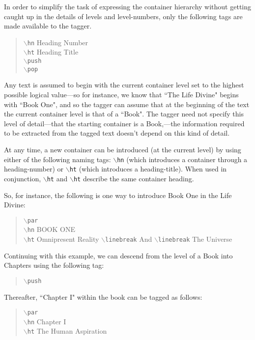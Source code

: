 \documentclass[11pt]{article}
\newcommand{\cmd}[1]{{\tt $\backslash$#1}}
\begin{document}
In order to simplify the task of expressing the container hierarchy
without getting caught up in the details of levels and level-numbers,
only the following tags are made available to the tagger.

\begin{quote}
  \cmd{hn} Heading Number\\
  \cmd{ht} Heading Title\\
  \cmd{push}\\
  \cmd{pop}\\
\end{quote}

Any text is assumed to begin with the current container level set to
the highest possible logical value---so for instance, we know that
``The Life Divine" begins with ``Book One", and so the tagger can
assume that at the beginning of the text the current container level
is that of a ``Book". The tagger need not specify this level of
detail---that the starting container is a Book,---the information
required to be extracted from the tagged text doesn't depend on this
kind of detail.

At any time, a new container can be introduced (at the current level)
by using either of the following naming tags: \cmd{hn} (which
introduces a container through a heading-number) or \cmd{ht} (which
introduces a heading-title). When used in conjunction, \cmd{ht} and
\cmd{ht} describe the same container heading.

So, for instance, the following is one way to introduce Book One in
the Life Divine:

\begin{quote}
  \cmd{par}\\
  \cmd{hn} BOOK ONE\\
  \cmd{ht} Omnipresent Reality \cmd{linebreak} And \cmd{linebreak} The Universe
\end{quote}

\noindent Continuing with this example, we can descend from the level of a Book
into Chapters using the following tag:

\begin{quote}
  \cmd{push}
\end{quote}

\noindent Thereafter, ``Chapter I" within the book can be tagged as follows:

\begin{quote}
  \cmd{par}\\
  \cmd{hn} Chapter I\\
  \cmd{ht} The Human Aspiration
\end{quote}
\end{document}
